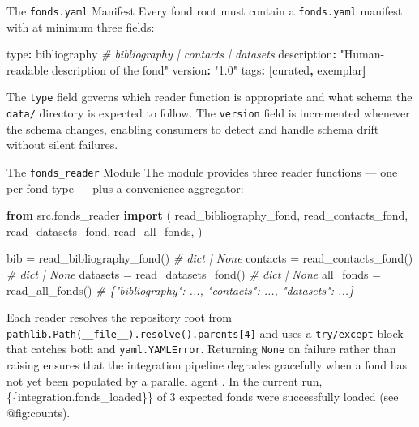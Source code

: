 \documentclass[
  ignorenonframetext,
]{beamer}
\newenvironment{Shaded}{}{}
\newcommand{\AttributeTok}[1]{\textcolor[rgb]{0.49,0.56,0.16}{#1}}
\newcommand{\CommentTok}[1]{\textcolor[rgb]{0.38,0.63,0.69}{\textit{#1}}}
\newcommand{\FunctionTok}[1]{\textcolor[rgb]{0.02,0.16,0.49}{#1}}
\newcommand{\ImportTok}[1]{\textcolor[rgb]{0.00,0.50,0.00}{\textbf{#1}}}
\newcommand{\KeywordTok}[1]{\textcolor[rgb]{0.00,0.44,0.13}{\textbf{#1}}}
\newcommand{\NormalTok}[1]{#1}
\newcommand{\OperatorTok}[1]{\textcolor[rgb]{0.40,0.40,0.40}{#1}}
\newcommand{\StringTok}[1]{\textcolor[rgb]{0.25,0.44,0.63}{#1}}
\begin{document}
\begin{frame}{The \texttt{fonds.yaml}
Manifest}
\protect{}\label{the-fonds.yaml-manifest}
Every fond root must contain a \texttt{fonds.yaml} manifest with at
minimum three fields:

\begin{Shaded}
\begin{Highlighting}[]
\FunctionTok{type}\KeywordTok{:}\AttributeTok{ bibliography}\CommentTok{   \# bibliography | contacts | datasets}
\FunctionTok{description}\KeywordTok{:}\AttributeTok{ }\StringTok{"Human{-}readable description of the fond"}
\FunctionTok{version}\KeywordTok{:}\AttributeTok{ }\StringTok{"1.0"}
\FunctionTok{tags}\KeywordTok{:}\AttributeTok{ }\KeywordTok{[}\AttributeTok{curated}\KeywordTok{,}\AttributeTok{ exemplar}\KeywordTok{]}
\end{Highlighting}
\end{Shaded}

The \texttt{type} field governs which reader function is appropriate and
what schema the \texttt{data/} directory is expected to follow. The
\texttt{version} field is incremented whenever the schema changes,
enabling consumers to detect and handle schema drift without silent
failures.
\end{frame}

\begin{frame}{The \texttt{fonds\_reader}
Module}
\protect{}\label{the-fonds_reader-module}
The  module provides three reader functions
--- one per fond type --- plus a convenience aggregator:

\begin{Shaded}
\begin{Highlighting}[]
\ImportTok{from}\NormalTok{ src.fonds\_reader }\ImportTok{import}\NormalTok{ (}
\NormalTok{    read\_bibliography\_fond,}
\NormalTok{    read\_contacts\_fond,}
\NormalTok{    read\_datasets\_fond,}
\NormalTok{    read\_all\_fonds,}
\NormalTok{)}

\NormalTok{bib      }\OperatorTok{=}\NormalTok{ read\_bibliography\_fond()   }\CommentTok{\# dict | None}
\NormalTok{contacts }\OperatorTok{=}\NormalTok{ read\_contacts\_fond()       }\CommentTok{\# dict | None}
\NormalTok{datasets }\OperatorTok{=}\NormalTok{ read\_datasets\_fond()       }\CommentTok{\# dict | None}
\NormalTok{all\_fonds }\OperatorTok{=}\NormalTok{ read\_all\_fonds()          }\CommentTok{\# \{"bibliography": ..., "contacts": ..., "datasets": ...\}}
\end{Highlighting}
\end{Shaded}

Each reader resolves the repository root from
\texttt{pathlib.Path(\_\_file\_\_).resolve().parents{[}4{]}} and uses a
\texttt{try/except} block that catches both 
and \texttt{yaml.YAMLError}. Returning \texttt{None} on failure rather
than raising ensures that the integration pipeline degrades gracefully
when a fond has not yet been populated by a parallel agent
. In the current run,
\{\{integration.fonds\_loaded\}\} of 3 expected fonds were successfully
loaded (see @fig:counts).
\end{frame}
\end{document}

